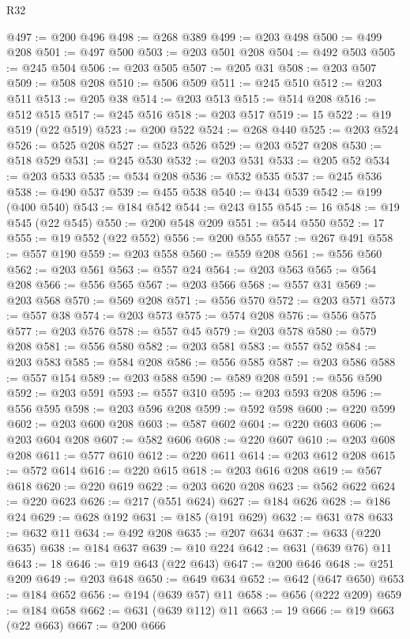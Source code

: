 \begin{lexlean}{R32}
\begin{coremodule}
@497 := @200 @496
@498 := @268 @389
@499 := @203 @498
@500 := @499 @208
@501 := @497 @500
@503 := @203 @501 @208
@504 := @492 @503
@505 := @245 @504
@506 := @203 @505
@507 := @205 @31
@508 := @203 @507
@509 := @508 @208
@510 := @506 @509
@511 := @245 @510
@512 := @203 @511
@513 := @205 @38
@514 := @203 @513
@515 := @514 @208
@516 := @512 @515
@517 := @245 @516
@518 := @203 @517
@519 := 15
@522 := @19 @519 (@22 @519)
@523 := @200 @522
@524 := @268 @440
@525 := @203 @524
@526 := @525 @208
@527 := @523 @526
@529 := @203 @527 @208
@530 := @518 @529
@531 := @245 @530
@532 := @203 @531
@533 := @205 @52
@534 := @203 @533
@535 := @534 @208
@536 := @532 @535
@537 := @245 @536
@538 := @490 @537
@539 := @455 @538
@540 := @434 @539
@542 := @199 (@400 @540)
@543 := @184 @542
@544 := @243 @155
@545 := 16
@548 := @19 @545 (@22 @545)
@550 := @200 @548 @209
@551 := @544 @550
@552 := 17
@555 := @19 @552 (@22 @552)
@556 := @200 @555
@557 := @267 @491
@558 := @557 @190
@559 := @203 @558
@560 := @559 @208
@561 := @556 @560
@562 := @203 @561
@563 := @557 @24
@564 := @203 @563
@565 := @564 @208
@566 := @556 @565
@567 := @203 @566
@568 := @557 @31
@569 := @203 @568
@570 := @569 @208
@571 := @556 @570
@572 := @203 @571
@573 := @557 @38
@574 := @203 @573
@575 := @574 @208
@576 := @556 @575
@577 := @203 @576
@578 := @557 @45
@579 := @203 @578
@580 := @579 @208
@581 := @556 @580
@582 := @203 @581
@583 := @557 @52
@584 := @203 @583
@585 := @584 @208
@586 := @556 @585
@587 := @203 @586
@588 := @557 @154
@589 := @203 @588
@590 := @589 @208
@591 := @556 @590
@592 := @203 @591
@593 := @557 @310
@595 := @203 @593 @208
@596 := @556 @595
@598 := @203 @596 @208
@599 := @592 @598
@600 := @220 @599
@602 := @203 @600 @208
@603 := @587 @602
@604 := @220 @603
@606 := @203 @604 @208
@607 := @582 @606
@608 := @220 @607
@610 := @203 @608 @208
@611 := @577 @610
@612 := @220 @611
@614 := @203 @612 @208
@615 := @572 @614
@616 := @220 @615
@618 := @203 @616 @208
@619 := @567 @618
@620 := @220 @619
@622 := @203 @620 @208
@623 := @562 @622
@624 := @220 @623
@626 := @217 (@551 @624)
@627 := @184 @626
@628 := @186 @24
@629 := @628 @192
@631 := @185 (@191 @629)
@632 := @631 @78
@633 := @632 @11
@634 := @492 @208
@635 := @207 @634
@637 := @633 (@220 @635)
@638 := @184 @637
@639 := @10 @224
@642 := @631 (@639 @76) @11
@643 := 18
@646 := @19 @643 (@22 @643)
@647 := @200 @646
@648 := @251 @209
@649 := @203 @648
@650 := @649 @634
@652 := @642 (@647 @650)
@653 := @184 @652
@656 := @194 (@639 @57) @11
@658 := @656 (@222 @209)
@659 := @184 @658
@662 := @631 (@639 @112) @11
@663 := 19
@666 := @19 @663 (@22 @663)
@667 := @200 @666

\end{coremodule}
\end{lexlean}
